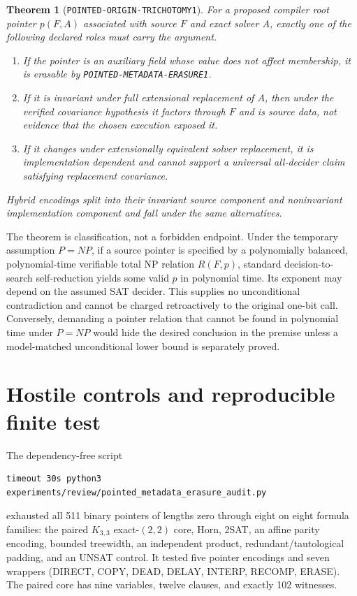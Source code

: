 \documentclass[11pt]{article}
\newtheorem{theorem}{Theorem}
\begin{document}
\begin{theorem}[\texttt{POINTED-ORIGIN-TRICHOTOMY1}]
For a proposed compiler root pointer $p(F,A)$ associated with source $F$ and exact solver $A$, exactly one of the following declared roles must carry the argument.
\begin{enumerate}[label=(\roman*)]
\item If the pointer is an auxiliary field whose value does not affect membership, it is erasable by \texttt{POINTED-METADATA-ERASURE1}.
\item If it is invariant under full extensional replacement of $A$, then under the verified covariance hypothesis it factors through $F$ and is source data, not evidence that the chosen execution exposed it.
\item If it changes under extensionally equivalent solver replacement, it is implementation dependent and cannot support a universal all-decider claim satisfying replacement covariance.
\end{enumerate}
Hybrid encodings split into their invariant source component and noninvariant implementation component and fall under the same alternatives.
\end{theorem}

The theorem is classification, not a forbidden endpoint.  Under the temporary assumption $P=NP$, if a source pointer is specified by a polynomially balanced, polynomial-time verifiable total NP relation $R(F,p)$, standard decision-to-search self-reduction yields some valid $p$ in polynomial time.  Its exponent may depend on the assumed SAT decider.  This supplies no unconditional contradiction and cannot be charged retroactively to the original one-bit call.  Conversely, demanding a pointer relation that cannot be found in polynomial time under $P=NP$ would hide the desired conclusion in the premise unless a model-matched unconditional lower bound is separately proved.

\section{Hostile controls and reproducible finite test}

The dependency-free script
\begin{verbatim}
timeout 30s python3 experiments/review/pointed_metadata_erasure_audit.py
\end{verbatim}
exhausted all 511 binary pointers of lengths zero through eight on eight formula families: the paired $K_{3,3}$ exact-$(2,2)$ core, Horn, 2SAT, an affine parity encoding, bounded treewidth, an independent product, redundant/tautological padding, and an UNSAT control.  It tested five pointer encodings and seven wrappers (DIRECT, COPY, DEAD, DELAY, INTERP, RECOMP, ERASE).  The paired core has nine variables, twelve clauses, and exactly 102 witnesses.
\end{document}
